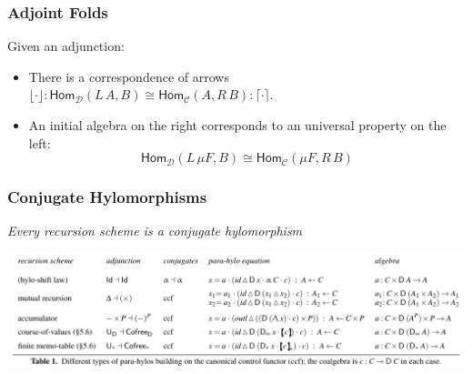 \begin{frame}[fragile]
  \frametitle{Adjoint Folds}
  Given an adjunction:

  \begin{center}\LARGE
  \end{center}

 \begin{itemize}
   \item There is a correspondence of arrows 
     $\lfloor\cdot\rfloor : \mathsf{Hom}_{\mathcal{D}}(L\, A,B) \cong 
     \mathsf{Hom}_{\mathcal{C}}(A,R\, B) : \lceil\cdot\rceil$.
   \item An initial algebra on the right corresponds to an universal property
     on the left:
     {\large
     \[
       \mathsf{Hom}_{\mathcal{D}}(L\, \mu F, B) \cong \mathsf{Hom}_{\mathcal{C}}(\mu F,R\, B)
     \]}
 \end{itemize}
\end{frame}

\begin{frame}[fragile]
  \frametitle{Conjugate Hylomorphisms}
  \centering
  {\Large\emph{Every recursion scheme is a conjugate hylomorphism}}%

  \vspace{.4cm}

  \begin{sticky}\includegraphics[width=\textwidth]{figures/types-of-parahylos-crop.pdf}\end{sticky}
\end{frame}


